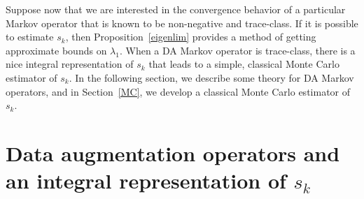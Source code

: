\documentclass[11pt]{article}
\begin{document}
	
	
	Suppose now that we are interested in the convergence behavior
        of a particular Markov operator that is known to be
        non-negative and trace-class.  If it is possible to estimate
        $s_k$, then Proposition~\ref{eigenlim} provides a method of
        getting approximate bounds on $\lambda_1$.  When a DA Markov
        operator is trace-class, there is a nice integral
        representation of $s_k$ that leads to a simple, classical
        Monte Carlo estimator of $s_k$.  In the following section, we
        describe some theory for DA Markov operators, and in
        Section~\ref{MC}, we develop a classical Monte Carlo estimator
        of $s_k$.

	\section{Data augmentation operators and an integral representation of $s_k$} \label{daint}
	
\end{document}
